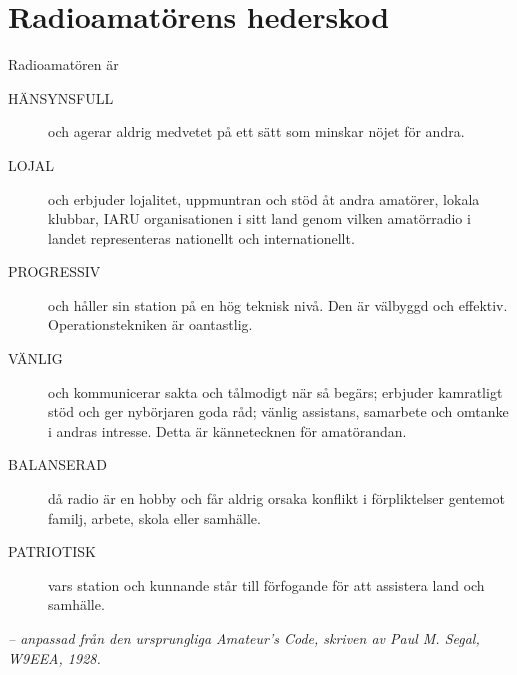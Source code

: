 \newpage %
\section[Hederskod]{Radioamatörens hederskod}

Radioamatören är

\begin{description}
  \item[HÄNSYNSFULL] och agerar aldrig medvetet på ett sätt som minskar nöjet
    för andra.

  \item[LOJAL] och erbjuder lojalitet, uppmuntran och stöd åt andra amatörer,
    lokala klubbar, IARU organisationen i sitt land genom vilken amatörradio i
    landet representeras nationellt och internationellt.

  \item[PROGRESSIV] och håller sin station på en hög teknisk nivå. Den är
    välbyggd och effektiv. Operationstekniken är oantastlig.

  \item[VÄNLIG] och kommunicerar sakta och tålmodigt när så begärs; erbjuder
    kamratligt stöd och ger nybörjaren goda råd; vänlig assistans, samarbete och
    omtanke i andras intresse. Detta är kännetecknen för amatörandan.

  \item[BALANSERAD] då radio är en hobby och får aldrig orsaka konflikt i
    förpliktelser gentemot familj, arbete, skola eller samhälle.

  \item[PATRIOTISK] vars station och kunnande står till förfogande för att
    assistera land och samhälle.
\end{description}

\emph{-- anpassad från den ursprungliga Amateur's Code, skriven av Paul M. Segal, W9EEA, 1928.}
